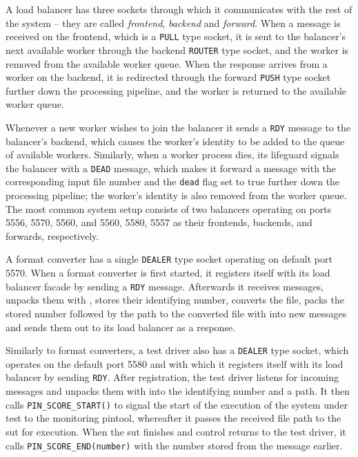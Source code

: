 A load balancer has three \zmq sockets through which it communicates with the rest of the system -- they are
called \emph{frontend}, \emph{backend} and \emph{forward}. When a message is received on the frontend,
which is a \texttt{PULL} type socket, it is sent to the balancer's next available worker through
the backend \texttt{ROUTER} type socket, and the worker is removed from the available worker queue. When the
response arrives from a worker on the backend, it is redirected through the forward \texttt{PUSH} type socket
further down the processing pipeline, and the worker is returned to the available worker queue. 

Whenever a new worker wishes to join the balancer it sends a \texttt{RDY} message to the balancer's backend,
which causes the worker's identity to be added to the queue of available workers. Similarly, when a worker
process dies, its lifeguard signals the balancer with a \texttt{DEAD} message, which makes it forward a
message with the corresponding input file number and the \texttt{dead} flag set to true further down the
processing pipeline; the worker's identity is also removed from the worker queue. The most common system setup
consists of two balancers operating on ports 5556, 5570, 5560, and 5560, 5580, 5557 as their frontends,
backends, and forwards, respectively.

A format converter has a single \texttt{DEALER} type socket operating on default port 5570.
When a format converter is first started, it registers itself with its load balancer facade by sending a
\texttt{RDY} message. Afterwards it receives \zmq messages, unpacks them with \msgpack, stores their
identifying number, converts the file, packs the stored number followed by the path to the converted file with
\msgpack into new \zmq messages and sends them out to its load balancer as a response.

Similarly to format converters, a test driver also has a \texttt{DEALER} type socket, which operates on the
default port 5580 and with which it registers itself with its load balancer by sending \texttt{RDY}. After
registration, the test driver listens for incoming \zmq messages and unpacks them with \msgpack
into the identifying number and a path. It then calls \texttt{PIN\_SCORE\_START()} to signal the start of the
execution of the system under test to the monitoring pintool, whereafter it passes the received file path to
the sut for execution. When the sut finishes and control returns to the test driver, it calls
\texttt{PIN\_SCORE\_END(number)} with the number stored from the message earlier.

